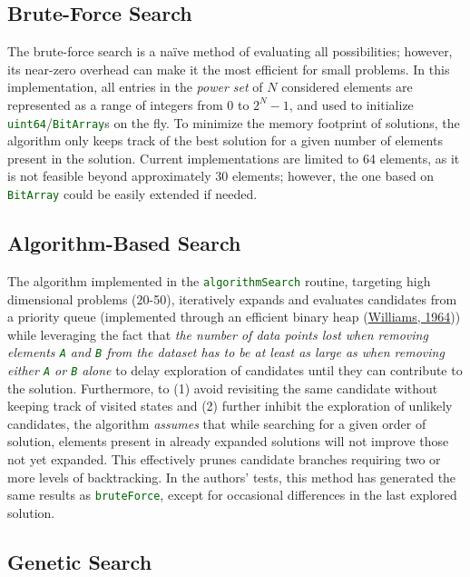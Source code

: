 \documentclass[
]{article}
\let\oldtexttt\texttt
\renewcommand{\texttt}[1]{\oldtexttt{\textcolor{darkgreen}{#1}}}
\begin{document}
\hypertarget{brute-force-search}{%
\subsection{Brute-Force Search}\label{brute-force-search}}

The brute-force search is a naïve method of evaluating all
possibilities; however, its near-zero overhead can make it the most
efficient for small problems. In this implementation, all entries in the
\emph{power set} of \(N\) considered elements are represented as a range
of integers from \(0\) to \(2^{N} - 1\), and used to initialize
\texttt{uint64}/\texttt{BitArray}s on the fly. To minimize the memory
footprint of solutions, the algorithm only keeps track of the best
solution for a given number of elements present in the solution. Current
implementations are limited to 64 elements, as it is not feasible beyond
approximately 30 elements; however, the one based on \texttt{BitArray}
could be easily extended if needed.

\hypertarget{algorithm-based-search}{%
\subsection{Algorithm-Based Search}\label{algorithm-based-search}}

The algorithm implemented in the \texttt{algorithmSearch} routine,
targeting high dimensional problems (20-50), iteratively expands and
evaluates candidates from a priority queue (implemented through an
efficient binary heap (\protect\hyperlink{ref-Williams1964}{Williams,
1964})) while leveraging the fact that \emph{the number of data points
lost when removing elements \texttt{A} and \texttt{B} from the dataset
has to be at least as large as when removing either \texttt{A} or
\texttt{B} alone} to delay exploration of candidates until they can
contribute to the solution. Furthermore, to (1) avoid revisiting the
same candidate without keeping track of visited states and (2) further
inhibit the exploration of unlikely candidates, the algorithm
\emph{assumes} that while searching for a given order of solution,
elements present in already expanded solutions will not improve those
not yet expanded. This effectively prunes candidate branches requiring
two or more levels of backtracking. In the authors' tests, this method
has generated the same results as \texttt{bruteForce}, except for
occasional differences in the last explored solution.

\hypertarget{genetic-search}{%
\subsection{Genetic Search}\label{genetic-search}}
\end{document}
